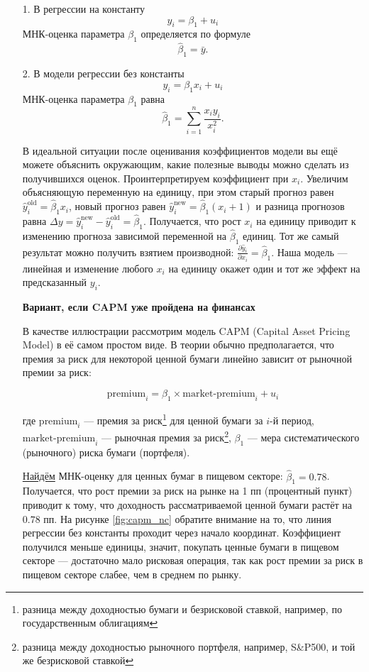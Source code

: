 \documentclass[12pt]{article}
\newcommand{\hb}{\hat{\beta}}
\newcommand{\hy}{\hat{y}}
\newcommand{\new}{\text{new}}
\newcommand{\old}{\text{old}}
\begin{document}
\begin{enumerate}
    \item[1.] В регрессии на константу
\[
y_i = \beta_1 + u_i
\]
МНК-оценка параметра $\beta_1$ определяется по формуле
\[
\hb_1 = \bar{y}.
\]

\item[2.] В модели регрессии без константы
\[
y_i = \beta_1 x_i + u_i
\]
МНК-оценка параметра $\beta_1$ равна 
\[
\hb_1 = \sum_{i=1}^n \frac{x_i y_i}{x_i^2}.
\]

В идеальной ситуации после оценивания коэффициентов модели вы ещё можете объяснить окружающим, какие полезные выводы можно сделать из получившихся оценок. 
Проинтерпретируем коэффициент при $x_i$. 
Увеличим объясняющую переменную на единицу, при этом старый прогноз равен $\hy_i^{\old} = \hb_1 x_i$, новый прогноз равен $\hy_i^{\new} = \hb_1 (x_i + 1)$ и разница прогнозов равна $\Delta y = \hy_i^{\new} - \hy_i^{\old} = \hb_1$. 
Получается, что рост $x_i$ на единицу приводит к изменению прогноза зависимой переменной на $\hb_1$ единиц. 
Тот же самый результат можно получить взятием производной: $\frac{\partial \hy_i}{\partial x_i} = \hb_1$.
Наша модель — линейная и изменение любого $x_i$ на единицу окажет один и тот же эффект на предсказанный $y_i$.

\textbf{Вариант, если CAPM уже пройдена на финансах}

В качестве иллюстрации рассмотрим модель CAPM (Capital Asset Pricing Model) в её самом простом виде. 
В теории обычно предполагается, что премия за риск для некоторой ценной бумаги линейно зависит от рыночной премии за риск:

\[\text{premium}_i = \beta_1 \times \text{market-premium}_i + u_i\]

где $\text{premium}_i$ — премия за риск\footnote{разница между доходностью бумаги и безрисковой ставкой, например, по государственным облигациям} для ценной бумаги за $i$-й период,
$\text{market-premium}_i$ — рыночная премия за риск\footnote{разница между доходностью рыночного портфеля, например, S\&P500, и той же безрисковой ставкой},
$\beta_1$ — мера систематического (рыночного) риска бумаги (портфеля).

\href{https://colab.research.google.com/drive/1ZQ7QuVCJS4I_GsXUrr7z7O-3wqXkXSMN?usp=sharing}{Найдём} МНК-оценку для ценных бумаг в пищевом секторе: $\hb_1 = 0.78$. 
Получается, что рост премии за риск на рынке на 1 пп (процентный пункт) приводит к тому, что доходность рассматриваемой ценной бумаги растёт на $0.78$ пп. 
На рисунке \ref{fig:capm_nc} обратите внимание на то, что линия регрессии без константы проходит через начало координат. 
Коэффициент получился меньше единицы, значит, покупать ценные бумаги в пищевом секторе — достаточно мало рисковая операция, так как рост премии за риск в пищевом секторе слабее, чем в среднем по рынку.


\end{enumerate}
\end{document}
